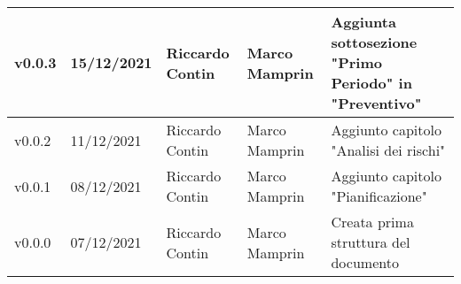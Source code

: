 {\begin{longtable}{|C{1.8cm}|C{2.1cm}|C{2cm}|C{2.4cm}|L{4.4cm}|}
  v0.0.3        & 15/12/2021    & Riccardo Contin   & Marco Mamprin                   & Aggiunta sottosezione "Primo Periodo" in "Preventivo" \\ \hline
  v0.0.2        & 11/12/2021    & Riccardo Contin   & Marco Mamprin                   & Aggiunto capitolo "Analisi dei rischi" \\ \hline
  v0.0.1        & 08/12/2021    & Riccardo Contin   & Marco Mamprin                   & Aggiunto capitolo "Pianificazione" \\ \hline
  v0.0.0        & 07/12/2021    & Riccardo Contin   & Marco Mamprin                   & Creata prima struttura del documento \\ \hline
\end{longtable}}

\renewcommand\arraystretch{1}
